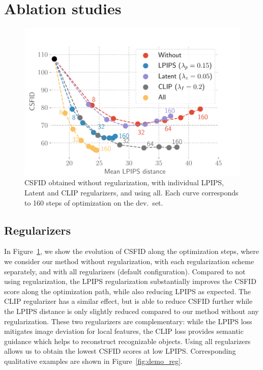 \section{Ablation studies\label{ablations}}


\begin{figure}[h!]
    \centering
    \vspace{-1em}
    \includegraphics[width=\linewidth]{images/flexit/assets/reg_evol.pdf}
    \caption{\ac{CSFID} obtained without regularization, with individual \ac{LPIPS}, Latent and \ac{CLIP} regularizers, and using all. 
    Each curve corresponds to 160 steps of optimization on the dev.\ set. 
    }
\label{fig:regul}
\end{figure}

\subsection{Regularizers}
In Figure~\ref{fig:regul}, we show the evolution of \ac{CSFID} along the optimization steps, 
where we consider our method without regularization, with each regularization scheme 
separately, and with all regularizers (default configuration).
Compared to not using regularization, the \ac{LPIPS} regularization substantially improves
 the \ac{CSFID} score along the optimization path, while also reducing \ac{LPIPS} as expected. 
The \ac{CLIP} regularizer has a similar effect, but is able to reduce  \ac{CSFID} further while
 the \ac{LPIPS} distance is only slightly reduced compared to our method without any 
 regularization.
These two regularizers are complementary: while the \ac{LPIPS} loss mitigates image 
deviation for local features, the \ac{CLIP} loss provides semantic guidance which helps to 
reconstruct recognizable objects. %
Using all regularizers allows us to obtain the lowest \ac{CSFID} scores at low \ac{LPIPS}. 
Corresponding qualitative examples are shown in Figure~\ref{fig:demo_reg}. 

